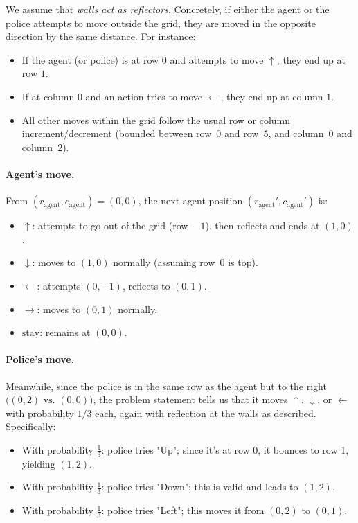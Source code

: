 \begin{enumerate}
    We assume that \emph{walls act as reflectors}.  Concretely, if either the agent or the police attempts to move outside the grid, they are moved in the opposite direction by the same distance.  For instance:
    \begin{itemize}
      \item If the agent (or police) is at row \(0\) and attempts to move \(\uparrow\), they end up at row \(1\).
      \item If at column \(0\) and an action tries to move \(\leftarrow\), they end up at column \(1\).
      \item All other moves within the grid follow the usual row or column increment/decrement (bounded between row~\(0\) and row~\(5\), and column~\(0\) and column~\(2\)).
    \end{itemize}

    \paragraph{Agent's move.}
    From \(
    (r_{\text{agent}},c_{\text{agent}}) = (0,0)\),
    the next agent position \((r_{\text{agent}}',c_{\text{agent}}')\) is:
    \begin{itemize}
      \item \(\uparrow\):  attempts to go out of the grid (row~\(-1\)), then reflects and ends at \((1,0)\).
      \item \(\downarrow\): moves to \((1,0)\) normally (assuming row~\(0\) is top).
      \item \(\leftarrow\): attempts \((0,-1)\), reflects to \((0,1)\).
      \item \(\rightarrow\): moves to \((0,1)\) normally.
      \item \(\text{stay}\): remains at \((0,0)\).
    \end{itemize}

    \paragraph{Police's move.}
    Meanwhile, since the police is in the same row as the agent but to the right
    \(\bigl( (0,2) \text{ vs. } (0,0) \bigr)\), the problem statement tells us that it moves
    \(\uparrow\), \(\downarrow\), or \(\leftarrow\) with probability \(1/3\) each, again with reflection at the walls as described. Specifically:
    \begin{itemize}
      \item With probability \(\frac{1}{3}\): police tries "Up"; since it's at row 0, it bounces to row 1, yielding \((1,2)\).
      \item With probability \(\frac{1}{3}\): police tries "Down"; this is valid and leads to \((1,2)\).
      \item With probability \(\frac{1}{3}\): police tries "Left"; this moves it from \((0,2)\) to \((0,1)\).
    \end{itemize}


\end{enumerate}
